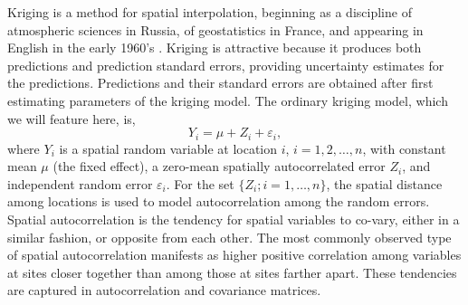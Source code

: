 \documentclass[11pt, titlepage]{article}\usepackage[]{graphicx}\usepackage[]{color}
\begin{document}
\begin{spacing}{1.9}
\begin{flushleft}
Kriging is a method for spatial interpolation, beginning as a discipline of atmospheric sciences in Russia, of geostatistics in France, and appearing in English in the early 1960's \citep{Gand:obje:1963, Math:Prin:1963,Cres:orig:1990}.  Kriging is attractive because it produces both predictions and prediction standard errors, providing uncertainty estimates for the predictions. Predictions and their standard errors are obtained after first estimating parameters of the kriging model.  The ordinary kriging model, which we will feature here, is,
\begin{equation} \label{eq:OKmodel}
    Y_i = \mu + Z_i + \varepsilon_i,
\end{equation}
where $Y_i$ is a spatial random variable at location $i$, $i = 1,2,\ldots,n$, with constant mean $\mu$ (the fixed effect), a zero-mean spatially autocorrelated error $Z_i$, and independent random error $ \varepsilon_i$. For the set $\{Z_i; i = 1,\ldots,n\}$, the spatial distance among locations is used to model autocorrelation among the random errors. Spatial autocorrelation is the tendency for spatial variables to co-vary, either in a similar fashion, or opposite from each other.  The most commonly observed type of spatial autocorrelation manifests as higher positive correlation among variables at sites closer together than among those at sites farther apart.  These tendencies are captured in autocorrelation and covariance matrices. 


\end{flushleft}
\end{spacing}
\end{document}

